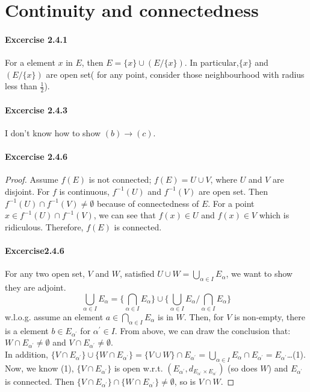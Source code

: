 \section{Continuity and connectedness}
\paragraph{Excercise 2.4.1} For a element $x$ in $E$, then $E=\{x\}\cup (E/\{x\})$. In particular,$\{x\}$ and $(E/\{x\})$ are open set( for any point, consider those neighbourhood with radius less than $\frac{1}{2}$).
\paragraph{Excercise 2.4.3} I don't know how to show $(b)\rightarrow(c)$.
\paragraph{Excercise 2.4.6} 
\begin{proof}
Assume $f(E)$ is not connected; $f(E)=U\cup V$, where $U$ and $V$ are disjoint. For $f$ is continuous, $f^{-1}(U)$ and $f^{-1}(V)$ are open set. Then $f^{-1}(U)\cap f^{-1}(V)\neq\emptyset$ because of connectedness of $E$. For a point $x\in f^{-1}(U)\cap f^{-1}(V)$, we can see that $f(x)\in U$ and $f(x)\in V$ which is ridiculous. Therefore, $f(E)$ is connected.
\paragraph{Excercise2.4.6}For any two open set, $V$ and $W$, satisfied $U\cup W=\bigcup_{\alpha\in I}E_{\alpha}$, we want to show they are adjoint. 
\[
\bigcup_{\alpha\in I}E_{\alpha}=\{\bigcap_{\alpha\in I}E_{\alpha}\}\cup\{\bigcup_{\alpha\in I}E_{\alpha}/\bigcap_{\alpha\in I}E_{\alpha}\}
\]
w.l.o.g. assume an element $a\in\bigcap_{\alpha\in I}E_{\alpha}$ is in $W$. Then, for $V$ is non-empty, there is a element $b\in E_{\alpha^\prime}$ for $\alpha^\prime\in I$. From above, we can draw the conclusion that:$W\cap E_{\alpha^\prime}\neq\emptyset$ and $V\cap E_{\alpha^\prime}\neq\emptyset$.\\ In addition, $\{V\cap E_{\alpha^\prime}\}\cup\{W\cap E_{\alpha^\prime}\}=\{V\cup W\}\cap E_{\alpha^\prime}=\bigcup_{\alpha\in I}E_{\alpha}\cap E_{\alpha^\prime}=E_{\alpha^\prime}$\dots (1). Now, we know (1), $\{V\cap E_{\alpha^\prime}\}$ is open w.r.t. $(E_{\alpha^\prime},d_{E_{\alpha^\prime}\times E_{\alpha^\prime}})$ (so does $W$) and $E_{\alpha^\prime}$ is connected. Then $\{V\cap E_{\alpha^\prime}\}\cap\{W\cap E_{\alpha^\prime}\}\neq\emptyset$, so is $V\cap W$.
\end{proof}
